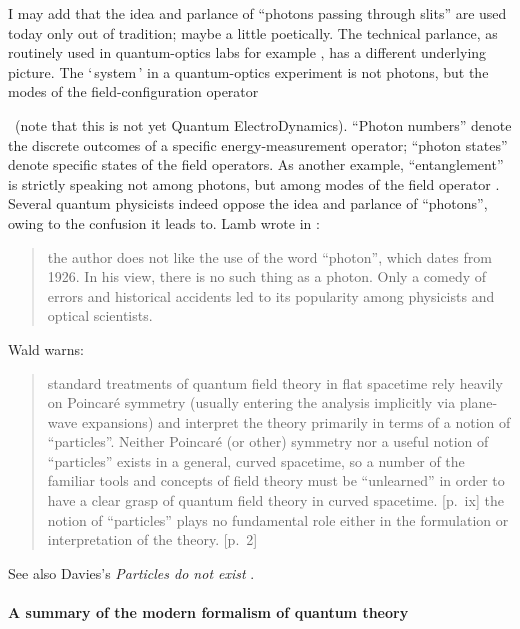 \documentclass[\ifafour a4paper,12pt,\else a5paper,10pt,\fi%
onecolumn,oneside,article,%
british%
]{memoir}
\newcommand*{\defquote}[1]{`\,#1\,'}
\theoremstyle{remark}
\theoremstyle{innote}
\newcommand*{\citep}{\parencites}%
\newcommand*{\citey}{\parencites*}
\newcommand*{\ibid}{\unspace\addtocounter{footnote}{-1}\footnotemark{}}
\renewcommand*{\|}[1][]{\nonscript\,#1\vert\nonscript\;\mathopen{}}
\begin{document}
I may add that the idea and parlance of \enquote{photons passing through
  slits} are used today only out of tradition; maybe a little poetically.
The technical parlance, as routinely used in quantum-optics labs for
example \citep{leonhardt1997,bachoretal1998_r2004}, has a different
underlying picture. The \defquote{system} in a quantum-optics experiment is
not photons, but the modes of the field-configuration operator\ibid\ (note
that this is not yet Quantum ElectroDynamics). \enquote{Photon numbers}
denote the discrete outcomes of a specific energy-measurement operator;
\enquote{photon states} denote specific states of the field operators. As
another example, \enquote{entanglement} is strictly speaking not among
photons, but among modes of the field operator \citep{vanenk2003b}. Several
quantum physicists indeed oppose the idea and parlance of
\enquote{photons}, owing to the confusion it leads to. Lamb \citep[of the
Lamb shift,][]{lambetal1947} wrote in \cite*{lamb1995}:
\begin{quote}
  \footnotesize the author does not like the use of the word ``photon'',
  which dates from 1926. In his view, there is no such thing as a photon.
  Only a comedy of errors and historical accidents led to its popularity
  among physicists and optical scientists.
\end{quote}
Wald \citey{wald1994} warns:
\begin{quote}
  \footnotesize standard treatments of quantum field theory in flat
  spacetime rely heavily on Poincar\'e symmetry (usually entering the
  analysis implicitly via plane-wave expansions) and interpret the theory
  primarily in terms of a notion of ``particles''. Neither Poincar\'e (or
  other) symmetry nor a useful notion of ``particles'' exists in a general,
  curved spacetime, so a number of the familiar tools and concepts of field
  theory must be ``unlearned'' in order to have a clear grasp of quantum
  field theory in curved spacetime. [p.~ix] \textelp{} the notion of
  ``particles'' plays no fundamental role either in the formulation or
  interpretation of the theory. [p.~2]
\end{quote}
See also Davies's \emph{Particles do not exist} \citey{davies1984}.

\bigskip

\paragraph{A summary of the modern formalism of quantum theory}
\end{document}
